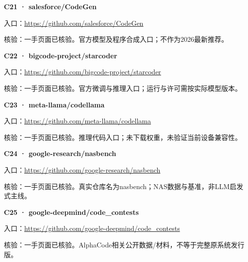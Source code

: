 \par\noindent\begin{minipage}{\linewidth}
\textbf{C21 · salesforce/CodeGen}

入口：\url{https://github.com/salesforce/CodeGen}

核验：一手页面已核验。官方模型及程序合成入口；不作为2026最新推荐。
\end{minipage}\par\vspace{6pt}

\par\noindent\begin{minipage}{\linewidth}
\textbf{C22 · bigcode-project/starcoder}

入口：\url{https://github.com/bigcode-project/starcoder}

核验：一手页面已核验。官方微调与推理入口；运行与许可需按实际模型版本。
\end{minipage}\par\vspace{6pt}

\par\noindent\begin{minipage}{\linewidth}
\textbf{C23 · meta-llama/codellama}

入口：\url{https://github.com/meta-llama/codellama}

核验：一手页面已核验。推理代码入口；未下载权重，未验证当前设备兼容性。
\end{minipage}\par\vspace{6pt}

\par\noindent\begin{minipage}{\linewidth}
\textbf{C24 · google-research/nasbench}

入口：\url{https://github.com/google-research/nasbench}

核验：一手页面已核验。真实仓库名为nasbench；NAS数据与基准，非LLM启发式主线。
\end{minipage}\par\vspace{6pt}

\par\noindent\begin{minipage}{\linewidth}
\textbf{C25 · google-deepmind/code\_contests}

入口：\url{https://github.com/google-deepmind/code_contests}

核验：一手页面已核验。AlphaCode相关公开数据/材料，不等于完整原系统发行版。
\end{minipage}\par\vspace{6pt}

